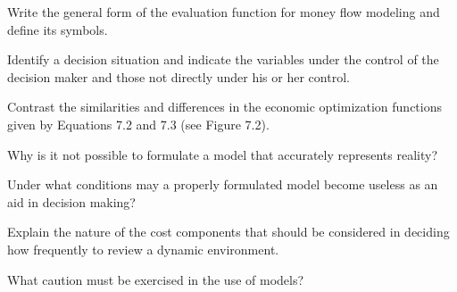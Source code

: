 \begin{exercises}
    \begin{exercise}
    \label{sea-07-08}
        Write the general form of the evaluation function for money flow modeling and define its symbols.
    \end{exercise}
    \begin{solution}
    \end{solution}
    
    \begin{exercise}
    \label{sea-07-09}
        Identify a decision situation and indicate the variables under the control of the decision maker and those not directly under his or her control.
    \end{exercise}
    \begin{solution}
    \end{solution}
    
    \begin{exercise}
    \label{sea-07-10}
        Contrast the similarities and differences in the economic optimization functions given by Equations 7.2 and 7.3 (see Figure 7.2).
    \end{exercise}
    \begin{solution}
    \end{solution}
    
    \begin{exercise}
    \label{sea-07-11}
        Why is it not possible to formulate a model that accurately represents reality?
    \end{exercise}
    \begin{solution}
    \end{solution}
    
    \begin{exercise}
    \label{sea-07-12}
        Under what conditions may a properly formulated model become useless as an aid in decision making?
    \end{exercise}
    \begin{solution}
    \end{solution}
    
    \begin{exercise}
    \label{sea-07-13}
        Explain the nature of the cost components that should be considered in deciding how frequently to review a dynamic environment.
    \end{exercise}
    \begin{solution}
    \end{solution}
    
    \begin{exercise}
    \label{sea-07-14}
        What caution must be exercised in the use of models?
    \end{exercise}
    \begin{solution}
    \end{solution}
    

\end{exercises}
